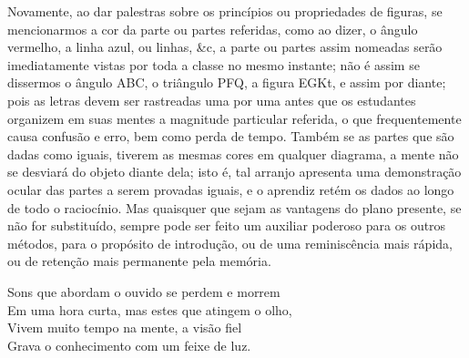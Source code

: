 \documentclass[booklanguage=brazilian]{byrnebook}
\begin{document}
Novamente, ao dar palestras sobre os princípios ou propriedades de figuras, se mencionarmos a cor da parte ou partes referidas, como ao dizer, o ângulo vermelho, a linha azul, ou linhas, \&c, a parte ou partes assim nomeadas serão imediatamente vistas por toda a classe no mesmo instante; não é assim se dissermos o ângulo ABC, o triângulo PFQ, a figura EGKt, e assim por diante; pois as letras devem ser rastreadas uma por uma antes que os estudantes organizem em suas mentes a magnitude particular referida, o que frequentemente causa confusão e erro, bem como perda de tempo. Também se as partes que são dadas como iguais, tiverem as mesmas cores em qualquer diagrama, a mente não se desviará do objeto diante dela; isto é, tal arranjo apresenta uma demonstração ocular das partes a serem provadas iguais, e o aprendiz retém os dados ao longo de todo o raciocínio. Mas quaisquer que sejam as vantagens do plano presente, se não for substituído, sempre pode ser feito um auxiliar poderoso para os outros métodos, para o propósito de introdução, ou de uma reminiscência mais rápida, ou de retenção mais permanente pela memória.


\baselineskip

\begin{center} %
Sons que abordam o ouvido se perdem e morrem\\
Em uma hora curta, mas estes que atingem o olho,\\
Vivem muito tempo na mente, a visão fiel\\
Grava o conhecimento com um feixe de luz.
\end{center}
\end{document}
